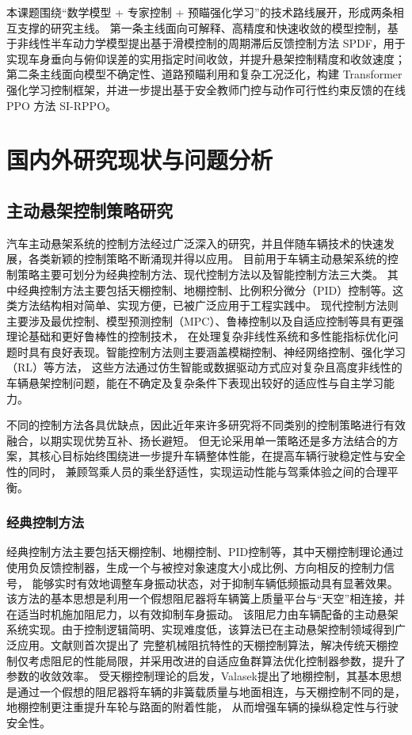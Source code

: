 本课题围绕“数学模型 + 专家控制 + 预瞄强化学习”的技术路线展开，形成两条相互支撑的研究主线。
第一条主线面向可解释、高精度和快速收敛的模型控制，基于非线性半车动力学模型提出基于滑模控制的周期滞后反馈控制方法 SPDF，用于实现车身垂向与俯仰误差的实用指定时间收敛，并提升悬架控制精度和收敛速度；
第二条主线面向模型不确定性、道路预瞄利用和复杂工况泛化，构建 Transformer 强化学习控制框架，并进一步提出基于安全教师门控与动作可行性约束反馈的在线 PPO 方法 SI-RPPO。

\section{国内外研究现状与问题分析}
\subsection{主动悬架控制策略研究}
汽车主动悬架系统的控制方法经过广泛深入的研究，并且伴随车辆技术的快速发展，各类新颖的控制策略不断涌现并得以应用。
目前用于车辆主动悬架系统的控制策略主要可划分为经典控制方法、现代控制方法以及智能控制方法三大类。
其中经典控制方法主要包括天棚控制、地棚控制、比例积分微分（PID）控制等。这类方法结构相对简单、实现方便，已被广泛应用于工程实践中。
现代控制方法则主要涉及最优控制、模型预测控制（MPC）、鲁棒控制以及自适应控制等具有更强理论基础和更好鲁棒性的控制技术，
在处理复杂非线性系统和多性能指标优化问题时具有良好表现。智能控制方法则主要涵盖模糊控制、神经网络控制、强化学习（RL）等方法，
这些方法通过仿生智能或数据驱动方式应对复杂且高度非线性的车辆悬架控制问题，能在不确定及复杂条件下表现出较好的适应性与自主学习能力。


不同的控制方法各具优缺点，因此近年来许多研究将不同类别的控制策略进行有效融合，以期实现优势互补、扬长避短。
但无论采用单一策略还是多方法结合的方案，其核心目标始终围绕进一步提升车辆整体性能，在提高车辆行驶稳定性与安全性的同时，
兼顾驾乘人员的乘坐舒适性，实现运动性能与驾乘体验之间的合理平衡。
\subsubsection{经典控制方法}
经典控制方法主要包括天棚控制、地棚控制、PID控制等，其中天棚控制理论通过使用负反馈控制器，生成一个与被控对象速度大小成比例、方向相反的控制力信号，
能够实时有效地调整车身振动状态，对于抑制车辆低频振动具有显著效果\cite{karnopp1974vibration}。
该方法的基本思想是利用一个假想阻尼器将车辆簧上质量平台与“天空”相连接，并在适当时机施加阻尼力，以有效抑制车身振动。
该阻尼力由车辆配备的主动悬架系统实现。由于控制逻辑简明、实现难度低，该算法已在主动悬架控制领域得到广泛应用。文献则首次提出了
完整机械阻抗特性的天棚控制算法，解决传统天棚控制仅考虑阻尼的性能局限，并采用改进的自适应鱼群算法优化控制器参数，提升了参数的收敛效率。
受天棚控制理论的启发，Valasek提出了地棚控制，其基本思想是通过一个假想的阻尼器将车辆的非簧载质量与地面相连，与天棚控制不同的是，地棚控制更注重提升车轮与路面的附着性能，
从而增强车辆的操纵稳定性与行驶安全性\cite{valavsek1997extended}。

